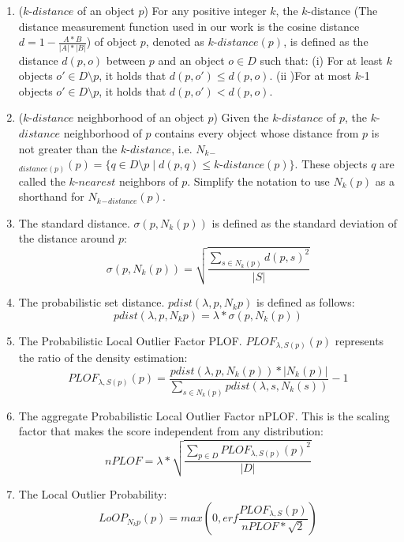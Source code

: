 \documentclass[referee]{raa}            %
\begin{document}
\begin{enumerate}
					\item    ($k$-$distance$ of an object $p$) For any
					positive integer $k$,  the $k$-distance  (The distance measurement function used in our work is the cosine distance $d=1-\frac{A*B}{|A|*|B|}$) of object $p$, denoted as
					$k$-$distance  (p)$, is defined as the distance $d  (p, o)$ between $p$ and
					an object $o\in D$ such that:
					  (i) For at least $k$ objects $o'\in{D}\setminus{p}$, it holds that $d  (p, o')\le d  (p, o)$.
					  (ii )For at most $k$-1 objects $o'\in D\setminus p$, 	it holds that $d  (p, o')$$<$$d  (p, o)$.
					
					\item  ($k$-$distance$ neighborhood of an object $p$)
					Given the $k$-$distance$ of $p$, the $k$-$distance$ neighborhood of $p$
					contains every object whose distance from $p$ is not greater than
					the $k$-$distance$, i.e. $N_{k}$$_-$$_{distance  (p)}  (p)=\{q\in D\setminus p\mid
					d  (p, q)\leq k$-$distance  (p)\}$. These objects $q$ are called the
					$k$-$nearest$ neighbors of $p$. Simplify the notation to use
					$N_{k}  (p)$ as a shorthand for $N_k$$_{-}$$_{distance}  (p)$.
					
					  \item  The standard distance. $\sigma (p,N_k (p))$ is defined as the standard deviation of the distance around $p$:
					  \begin{equation}
					   \sigma (p,N_k (p))=\sqrt{\frac{\sum_{s\in N_k (p)}^{} d (p,s)^2}{|S|}}
					  \end{equation}
					
					 \item  The probabilistic set distance. $pdist (\lambda,p,N_k{p})$ is defined as follows:
					  \begin{equation}
					  pdist (\lambda,p,N_k{p})=\lambda*\sigma (p,N_k (p))
					  \end{equation}
					
					   \item The Probabilistic Local Outlier Factor PLOF.  $PLOF_{\lambda,S (p)} (p)$ represents the ratio of the density estimation:
					  \begin{equation}
					   PLOF_{\lambda,S (p)} (p)=\frac{pdist (\lambda,p,N_k (p))*|N_k (p)|}{\sum_{s\in N_k (p)}^{}pdist (\lambda,s,N_k (s))}-1
					  \end{equation}
					
					  \item The aggregate Probabilistic Local Outlier Factor nPLOF.  This is the scaling factor that makes the score independent from any distribution:
					  \begin{equation}
					   nPLOF=\lambda*\sqrt{\frac{\sum_{p\in D}^{}PLOF_{\lambda,S (p)} (p)^2}{|D|}}
					  \end{equation}
					
					  \item The Local Outlier Probability:
					  \begin{equation}
					   LoOP_{N_k{p}} (p)=max (0,erf\frac{PLOF_{\lambda,S} (p)}{nPLOF*\sqrt{2}})
					  \end{equation}
\end{enumerate}
\end{document}
